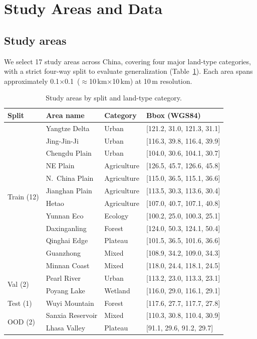 \documentclass{article}
\begin{document}
\section{Study Areas and Data}
\label{sec:data}

\subsection{Study areas}

We select 17 study areas across China, covering four major land-type categories, with a strict four-way split to evaluate generalization (Table~\ref{tab:areas}). Each area spans approximately 0.1\textdegree$\times$0.1\textdegree\ ($\approx$10\,km$\times$10\,km) at 10\,m resolution.

\begin{table}[htbp]
\centering
\caption{Study areas by split and land-type category.}
\label{tab:areas}
\begin{tabular}{llll}
\toprule
Split & Area name & Category & Bbox (WGS84) \\
\midrule
\multirow{12}{*}{Train (12)} & Yangtze Delta & Urban & [121.2, 31.0, 121.3, 31.1] \\
 & Jing-Jin-Ji & Urban & [116.3, 39.8, 116.4, 39.9] \\
 & Chengdu Plain & Urban & [104.0, 30.6, 104.1, 30.7] \\
 & NE Plain & Agriculture & [126.5, 45.7, 126.6, 45.8] \\
 & N.~China Plain & Agriculture & [115.0, 36.5, 115.1, 36.6] \\
 & Jianghan Plain & Agriculture & [113.5, 30.3, 113.6, 30.4] \\
 & Hetao & Agriculture & [107.0, 40.7, 107.1, 40.8] \\
 & Yunnan Eco & Ecology & [100.2, 25.0, 100.3, 25.1] \\
 & Daxinganling & Forest & [124.0, 50.3, 124.1, 50.4] \\
 & Qinghai Edge & Plateau & [101.5, 36.5, 101.6, 36.6] \\
 & Guanzhong & Mixed & [108.9, 34.2, 109.0, 34.3] \\
 & Minnan Coast & Mixed & [118.0, 24.4, 118.1, 24.5] \\
\midrule
\multirow{2}{*}{Val (2)} & Pearl River & Urban & [113.2, 23.0, 113.3, 23.1] \\
 & Poyang Lake & Wetland & [116.0, 29.0, 116.1, 29.1] \\
\midrule
Test (1) & Wuyi Mountain & Forest & [117.6, 27.7, 117.7, 27.8] \\
\midrule
\multirow{2}{*}{OOD (2)} & Sanxia Reservoir & Mixed & [110.3, 30.8, 110.4, 30.9] \\
 & Lhasa Valley & Plateau & [91.1, 29.6, 91.2, 29.7] \\
\bottomrule
\end{tabular}
\end{table}
\end{document}
